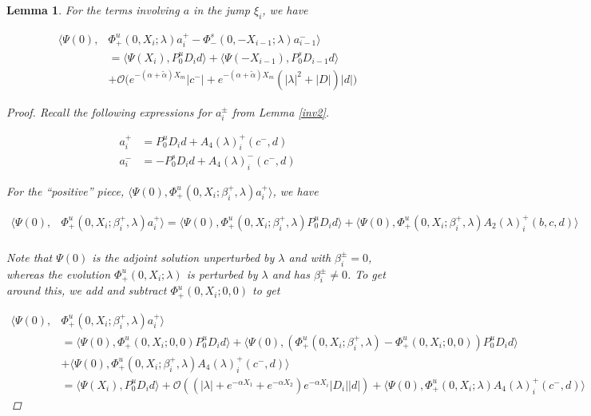 \documentclass[12pt]{article}
\newtheorem{lemma}{Lemma}
\begin{document}
\begin{lemma}\label{jumpa}
For the terms involving $a$ in the jump $\xi_i$, we have

\begin{align*}
\langle \Psi(0), &\Phi^u_+(0, X_i; \lambda)a_i^+ - \Phi^s_-(0, -X_{i-1}; \lambda)a_{i-1}^- \rangle \\
&= \langle \Psi(X_i), P^u_0 D_i d \rangle + \langle \Psi(-X_{i-1}), P^s_0 D_{i-1} d \rangle \\
&+ \mathcal{O}\Big( e^{-(\alpha + \tilde{\alpha})X_m} |c^-| + e^{-(\alpha + \tilde{\alpha})X_m}(|\lambda|^2 + |D| )|d| \Big)
\end{align*}

\begin{proof}

Recall the following expressions for $a_i^\pm$ from Lemma \ref{inv2}.

\begin{align*}
a_i^+ &= P^u_0 D_i d + A_4(\lambda)_i^+(c^-, d)\\
a_i^- &= -P^s_0 D_i d + A_4(\lambda)_i^-(c^-, d)
\end{align*}

For the ``positive'' piece, $\langle \Psi(0), \Phi^u_+(0, X_i; \beta_i^+, \lambda)a_i^+ \rangle$, we have

\begin{align*}
\langle \Psi(0), &\Phi^u_+(0, X_i; \beta_i^+, \lambda) a_i^+ \rangle = \langle \Psi(0), \Phi^u_+(0, X_i; \beta_i^+, \lambda) P^u_0 D_i d \rangle + \langle \Psi(0), \Phi^u_+(0, X_i; \beta_i^+, \lambda) A_2(\lambda)_i^+(b, c, d) \rangle \\
\end{align*} 

Note that $\Psi(0)$ is the adjoint solution unperturbed by $\lambda$ and with $\beta_i^\pm = 0$, whereas the evolution $\Phi^u_+(0, X_i; \lambda)$ is perturbed by $\lambda$ and has $\beta_i^\pm \neq 0$. To get around this, we add and subtract $\Phi^u_+(0, X_i; 0, 0)$ to get

\begin{align*}
\langle \Psi(0), &\Phi^u_+(0, X_i; \beta_i^+, \lambda) a_i^+ \rangle \\
&= \langle \Psi(0), \Phi^u_+(0, X_i; 0, 0) P^u_0 D_i d \rangle + \langle \Psi(0), (\Phi^u_+(0, X_i; \beta_i^+, \lambda) - \Phi^u_+(0, X_i; 0, 0)) P^u_0 D_i d \rangle \\
&+ \langle \Psi(0), \Phi^u_+(0, X_i; \beta_i^+, \lambda) A_4(\lambda)_i^+(c^-,d) \rangle \\
&= \langle \Psi(X_i), P^u_0 D_i d \rangle 
+ \mathcal{O}((|\lambda| + e^{-\alpha X_1} + e^{-\alpha X_2} ) e^{-\alpha X_i}|D_i||d|) + \langle \Psi(0), \Phi^u_+(0, X_i; \lambda) A_4(\lambda)_i^+(c^-,d) \rangle 
\end{align*}


\end{proof}
\end{lemma}
\end{document}
